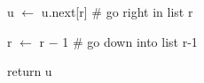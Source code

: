 \documentclass[12pt]{article}
\renewcommand{\_}{\kern-1.5pt\textunderscore\kern-1.5pt}
\begin{document}
\begin{adjustwidth}{1.0in}{0.0in}
u $ \leftarrow $  u.next[r] $\#$  go right in list r\par

\end{adjustwidth}

\begin{adjustwidth}{1.0in}{0.0in}
 r $ \leftarrow $  r $-$  1 $\#$  go down into list r-1 \par

\end{adjustwidth}

return u \par


\vspace{\baselineskip}

\vspace{\baselineskip}

\printbibliography
\end{document}
